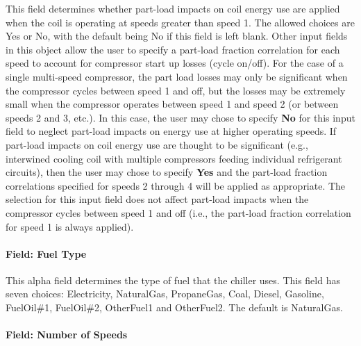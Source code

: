 This field determines whether part-load impacts on coil energy use are applied when the coil is operating at speeds greater than speed 1. The allowed choices are Yes or No, with the default being No if this field is left blank. Other input fields in this object allow the user to specify a part-load fraction correlation for each speed to account for compressor start up losses (cycle on/off). For the case of a single multi-speed compressor, the part load losses may only be significant when the compressor cycles between speed 1 and off, but the losses may be extremely small when the compressor operates between speed 1 and speed 2 (or between speeds 2 and 3, etc.). In this case, the user may chose to specify \textbf{No} for this input field to neglect part-load impacts on energy use at higher operating speeds. If part-load impacts on coil energy use are thought to be significant (e.g., interwined cooling coil with multiple compressors feeding individual refrigerant circuits), then the user may chose to specify \textbf{Yes} and the part-load fraction correlations specified for speeds 2 through 4 will be applied as appropriate. The selection for this input field does not affect part-load impacts when the compressor cycles between speed 1 and off (i.e., the part-load fraction correlation for speed 1 is always applied).

\paragraph{Field: Fuel Type}\label{field-fuel-type-1-000}

This alpha field determines the type of fuel that the chiller uses. This field has seven choices: Electricity, NaturalGas, PropaneGas, Coal, Diesel, Gasoline, FuelOil\#1, FuelOil\#2, OtherFuel1 and OtherFuel2. The default is NaturalGas.

\paragraph{Field: Number of Speeds}\label{field-number-of-speeds-2}

